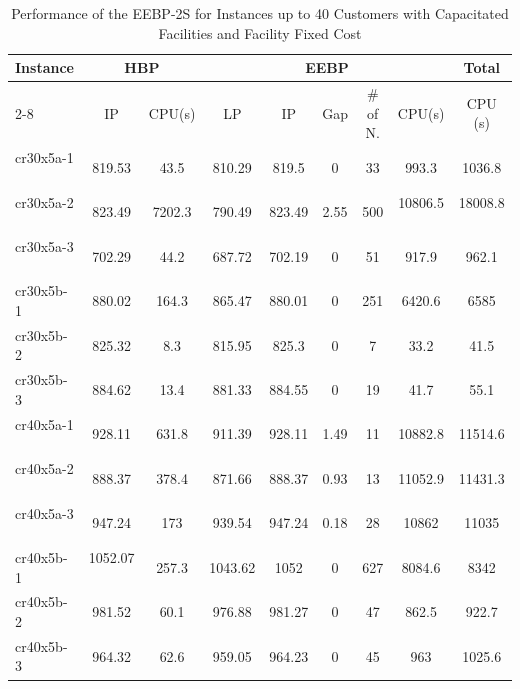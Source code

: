 \begin{table}[ht]
\caption{Performance of the EEBP-2S for Instances up to 40 Customers with Capacitated Facilities and Facility Fixed Cost}\label{gr5-fc}
\begin {tabular}[t]{|l|c|c|c|c|c|c|c|c|}  
\hline
Instance & \multicolumn{2}{|c|}{HBP} & \multicolumn{5}{|c|}{EEBP}& Total \\\cline{2-8}
\mbox{} & IP & CPU(s) & LP & IP & Gap & \# of N. & CPU(s) & CPU (s) \\\hline
cr30x5a-1  \ \ &	819.53	&	43.5	&	810.29	&	819.5	&	0	&	33	&	993.3	&	1036.8	     \\
cr30x5a-2 \ \ &	823.49	&	7202.3	&	790.49	&	823.49	&	2.55	&	500	&	10806.5 \ \	& 18008.8   \ \ \\
cr30x5a-3 \ \ &	702.29	&	44.2	&	687.72	&	702.19	&	0	&	51	&	917.9	&	962.1	\\
cr30x5b-1 \ \ &	880.02	&	164.3	&	865.47	&	880.01	&	0	&	251	&	6420.6	&	6585	\\
cr30x5b-2  \ \ &	825.32	&	8.3	&	815.95	&	825.3	&	0	&	7	&	33.2	&	41.5	\\
cr30x5b-3 \ \ &	884.62	&	13.4	&	881.33	&	884.55	&	0	&	19	&	41.7	&	55.1	\\
cr40x5a-1 \ \ &	928.11	&	631.8	&	911.39	&	928.11	&	1.49	&	11	&	10882.8 &	11514.6	\\
cr40x5a-2 \ \ &	888.37	&	378.4	&	871.66	&	888.37	&	0.93	&	13	&	11052.9 &	11431.3	\\
cr40x5a-3 \ \ &	947.24	&	173	&	939.54	&	947.24	&	0.18	&	28	&	10862 &	11035	\\
cr40x5b-1 \ \ &	1052.07 \ \	&	257.3	&	1043.62	&	1052	&	0	&	627	&	8084.6	&	8342	\\
cr40x5b-2 \ \ &	981.52	&	60.1	&	976.88	&	981.27	&	0	&	47	&	862.5	&	922.7	\\
cr40x5b-3 \ \ &	964.32	&	62.6	&	959.05	&	964.23	&	0	&	45	&	963	&	1025.6	\\
\hline
\end{tabular}
\end{table} 

